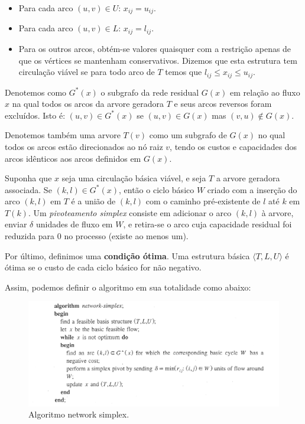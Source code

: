 \documentclass[12pt,a4]{article}
\begin{document}
\begin{itemize}
\item Para cada arco $(u,v) \in U$: $x_{ij} = u_{ij}$.

\item Para cada arco $(u,v) \in L$: $x_{ij} = l_{ij}$.

\item Para os outros arcos, obtém-se valores quaisquer com a restrição apenas de
  que os vértices se mantenham conservativos. Dizemos que esta estrutura tem
  circulação viável se para todo arco de $T$ temos que
  $l_{ij} \leq x_{ij} \leq u_{ij}$.
\end{itemize}

Denotemos como $G^*(x)$ o subgrafo da rede residual $G(x)$ em relação ao fluxo
$x$ na qual todos os arcos da arvore geradora $T$ e seus arcos reversos foram
excluídos. Isto é: $(u,v) \in G^*(x)$ se $(u,v) \in G(x)$ mas
$(v,u) \notin G(x)$.

Denotemos também uma arvore $T(v)$ como um subgrafo de $G(x)$ no qual todos os
arcos estão direcionados ao nó raiz $v$, tendo os custos e capacidades dos arcos
idênticos aos arcos definidos em $G(x)$.

Suponha que $x$ seja uma circulação básica viável, e seja $T$ a arvore geradora
associada. Se $(k,l) \in G^*(x)$, então o ciclo básico $W$ criado com a inserção
do arco $(k,l)$ em $T$ é a união de $(k,l)$ com o caminho pré-existente de $l$
até $k$ em $T(k)$. Um \textit{pivoteamento simplex} consiste em adicionar o arco
$(k,l)$ à arvore, enviar $\delta$ unidades de fluxo em $W$, e retira-se o arco
cuja capacidade residual foi reduzida para $0$ no processo (existe ao menos um).

Por último, definimos uma \textbf{condição ótima}. Uma estrutura básica
$\langle T,L,U \rangle$ é ótima se o custo de cada ciclo básico for não
negativo.

Assim, podemos definir o algoritmo em sua totalidade como abaixo:

\begin{figure}[H]
  \includegraphics[width=\linewidth]{simplex.png}
  \caption{Algoritmo network simplex.}
  \label{fig:netwok-simplex-algorithm}
\end{figure}
\end{document}
